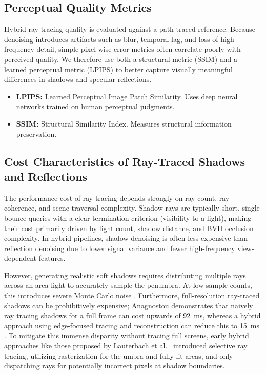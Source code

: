 \documentclass[12pt,a4paper]{report}
\begin{document}
\subsection{Perceptual Quality Metrics}
Hybrid ray tracing quality is evaluated against a path-traced reference.
Because denoising introduces artifacts such as blur, temporal lag, and loss of
high-frequency detail, simple pixel-wise error metrics often correlate poorly
with perceived quality. We therefore use both a structural metric (SSIM) and a
learned perceptual metric (LPIPS) to better capture visually meaningful
differences in shadows and specular reflections.
\begin{itemize}
    \item \textbf{LPIPS:} Learned Perceptual Image Patch Similarity. Uses deep neural networks trained on human perceptual judgments.
    \item \textbf{SSIM:} Structural Similarity Index. Measures structural information preservation.
\end{itemize}

\subsection{Cost Characteristics of Ray-Traced Shadows and Reflections}
The performance cost of ray tracing depends strongly on ray count, ray coherence, and scene traversal complexity.
Shadow rays are typically short, single-bounce queries with a clear termination criterion (visibility to a light),
making their cost primarily driven by light count, shadow distance, and BVH occlusion complexity. In hybrid pipelines,
shadow denoising is often less expensive than reflection denoising due to lower signal variance and fewer high-frequency view-dependent features.

However, generating realistic soft shadows requires distributing multiple rays across an area light to accurately sample the penumbra\cite{hamza2024, xie2007softshadows}.
At low sample counts, this introduces severe Monte Carlo noise \cite{wester2020}.
Furthermore, full-resolution ray-traced shadows can be prohibitively expensive; Anagnostou demonstrates that naively ray tracing shadows for a full frame can cost upwards of 92~ms,
whereas a hybrid approach using edge-focused tracing and reconstruction can reduce this to 15~ms \cite{anagnostou2021}. To mitigate this immense disparity without tracing full screens,
early hybrid approaches like those proposed by Lauterbach et al.\ \cite{lauterbach2009} introduced selective ray tracing,
utilizing rasterization for the umbra and fully lit areas, and only dispatching rays for potentially incorrect pixels at shadow boundaries.
\end{document}

